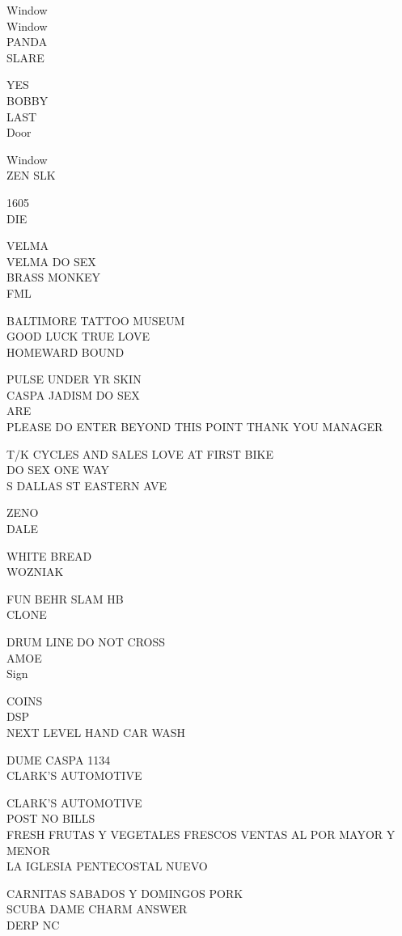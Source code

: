 \documentclass[10pt,letterpaper]{article}
\begin{document}
Window\\
Window\\
PANDA\\
SLARE

YES\\
BOBBY\\
LAST\\
Door

Window\\
ZEN SLK

1605\\
DIE

VELMA\\
VELMA DO SEX\\
BRASS MONKEY\\
FML

BALTIMORE TATTOO MUSEUM\\
GOOD LUCK TRUE LOVE\\
HOMEWARD BOUND

PULSE UNDER YR SKIN\\
CASPA JADISM DO SEX\\
ARE\\
PLEASE DO ENTER BEYOND THIS POINT THANK YOU MANAGER

T/K CYCLES AND SALES LOVE AT FIRST BIKE\\
DO SEX ONE WAY\\
S DALLAS ST EASTERN AVE

ZENO\\
DALE

WHITE BREAD\\
WOZNIAK

FUN BEHR SLAM HB\\
CLONE

DRUM LINE DO NOT CROSS\\
AMOE\\
Sign

COINS\\
DSP\\
NEXT LEVEL HAND CAR WASH

DUME CASPA 1134\\
CLARK'S AUTOMOTIVE

CLARK'S AUTOMOTIVE\\
POST NO BILLS\\
FRESH FRUTAS Y VEGETALES FRESCOS VENTAS AL POR MAYOR Y MENOR\\
LA IGLESIA PENTECOSTAL NUEVO

CARNITAS SABADOS Y DOMINGOS PORK\\
SCUBA DAME CHARM ANSWER\\
DERP NC
\end{document}

